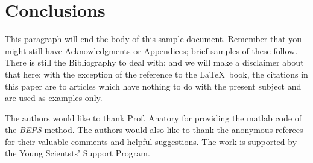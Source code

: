 \documentclass{jiveArticle}
\begin{document}
\section{Conclusions}
This paragraph will end the body of this sample document.
Remember that you might still have Acknowledgments or
Appendices; brief samples of these
follow.  There is still the Bibliography to deal with; and
we will make a disclaimer about that here: with the exception
of the reference to the \LaTeX\ book, the citations in
this paper are to articles which have nothing to
do with the present subject and are used as
examples only.


\begin{acks}
	The authors would like to thank Prof. Anatory for providing the
	matlab code of  the \textit{BEPS} method. The authors would also like to thank the anonymous referees for
	their valuable comments and helpful suggestions. The work is
	supported by the Young
		Scientsts' Support Program.
	
\end{acks}





\end{document}
